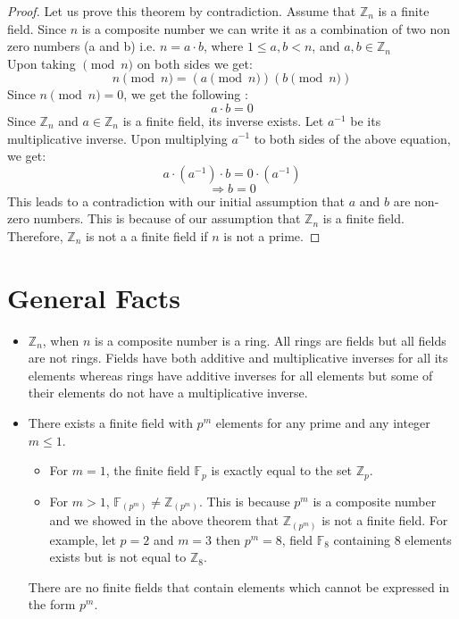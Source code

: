 \documentclass[11pt]{article}
\theoremstyle{definition}
\theoremstyle{plain}
\begin{document}
\begin{proof}
Let us prove this theorem by contradiction. Assume that  \( \mathbb{Z}_n \) is a finite field. Since $n$ is a composite number we can write it as a combination of two non zero numbers (a and b) i.e. 
$n = a \cdot b$, where $1 \leq a, b < n$, and $a, b \in \mathbb{Z}_n$\\

Upon taking $\pmod{n}$ on both sides we get:
\[ n \pmod{n} = (a \pmod{n})(b \pmod{n}) \]
Since $n \pmod{n} = 0$, we get the following :
\[a \cdot b = 0\]
 Since $\mathbb{Z}_n$
 and $a \in \mathbb{Z}_n$ is a finite field, its inverse exists. Let $a^{-1}$ be its multiplicative inverse. Upon multiplying $a^{-1}$ to both sides of the above equation, we get:
 \[a \cdot (a^{-1}) \cdot b = 0 \cdot (a^{-1})\]
\[\Rightarrow b = 0\] 
This leads to a contradiction with our initial assumption that $a$ and $b$ are non-zero numbers. This is because of our assumption that $\mathbb{Z}_n$ is a finite field.
Therefore, $\mathbb{Z}_n$ is not a a finite field if $n$ is not a prime.

\end{proof}

\section{General Facts}
\begin{itemize}
\item $\mathbb{Z}_n$, when $n$ is a composite number is a ring. All rings are fields but all fields are not rings. Fields have both additive and multiplicative inverses for all its elements whereas rings have additive inverses for all elements but some of their elements do not have a multiplicative inverse.
\item There exists a finite field with $p^{m}$ elements for any prime and any integer $m \leq 1$.
\begin{itemize}
\item For $m = 1$, the finite field $\mathbb{F}_p$ is exactly equal to the set $\mathbb{Z}_p$.

\item For $m > 1$, $\mathbb{F}_(p^m) \neq \mathbb{Z}_(p^m)$.
This is because $p^{m}$ is a composite number and we showed in the above theorem that $\mathbb{Z}_(p^{m})$ is not a finite field.\newline
For example, let $ p = 2$ and $m = 3$ then $p^{m} = 8$, field $\mathbb{F}_8$ containing 8 elements exists but is not equal to $\mathbb{Z}_8$.
\end{itemize}
There are no finite fields that contain elements which cannot be expressed in the form $p^{m}$.

\end{itemize}
\end{document}
